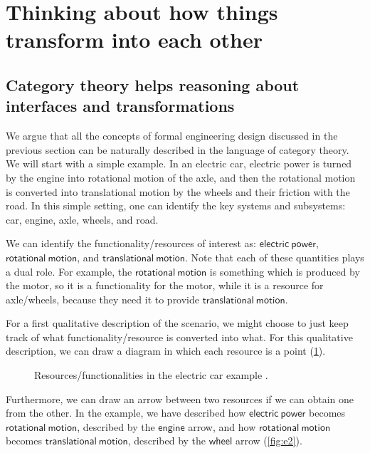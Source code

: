 \section{Thinking about how things transform into each other}

\subsection{Category theory helps reasoning about interfaces and transformations}

We argue that all the concepts of formal engineering design discussed in the
previous section can be naturally described in the language of category theory. We will start with a simple example. In an electric car, electric power is turned by the engine into rotational
motion of the axle, and then the rotational motion is converted into translational motion by the wheels and their friction with the road. In this simple setting, one can identify the key systems and subsystems: car, engine, axle, wheels, and road.

We can identify the functionality/resources of interest as: $\mathsf{electric} \ \mathsf{power}$, $\mathsf{rotational}\ \mathsf{motion}$, and $\mathsf{translational}\ \mathsf{motion}$. Note that each of these quantities plays a dual role. For example, the $\mathsf{rotational} \ \mathsf{motion}$ is something which is produced by the motor, so it is a functionality for the motor, while it is a resource for axle/wheels, because they need it to provide $\mathsf{translational}\ \mathsf{motion}$.

For a first qualitative description of the scenario, we might choose to just keep track of what functionality/resource is converted into what. For this qualitative description, we can draw a diagram in which each resource
is a point (\cref{fig:e1}).

\begin{figure}[h!]
    \centering
    \caption{Resources/functionalities in the electric car example \label{fig:e1}.}
\end{figure}

Furthermore, we can draw an arrow between two resources if we can obtain one
from the other. In the example, we have described how $\mathsf{electric}\ \mathsf{power}$ becomes $\mathsf{rotational}\ 
\mathsf{motion}$, described by the $\mathsf{engine}$ arrow, and how $\mathsf{rotational}\ 
\mathsf{motion}$ becomes $\mathsf{translational}\ \mathsf{motion}$, described by the $\mathsf{wheel}$ arrow (\cref{fig:e2}).

